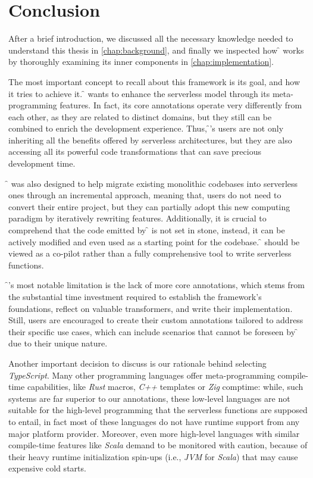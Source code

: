\chapter{Conclusion}
\label{chap:conclusion}

After a brief introduction, we discussed all the necessary knowledge needed
to understand this thesis in \cref{chap:background}, and finally we inspected
how \f{} works by thoroughly examining its inner components in \cref{chap:implementation}.

The most important concept to recall about this framework is its goal,
and how it tries to achieve it.
\f{} wants to enhance the serverless model through its meta-programming
features. In fact, its core annotations operate very differently from each other,
as they are related to distinct domains, but they still can be combined
to enrich the development experience.
Thus, \f{}'s users are not only inheriting all the
benefits offered by serverless architectures,
but they are also accessing all its powerful code
transformations that can save precious development time.

\f{} was also designed to help migrate existing
monolithic codebases into serverless ones through an incremental approach,
meaning that, users do not need to convert their entire project, but they
can partially adopt this new computing paradigm by iteratively rewriting features.
Additionally, it is crucial to comprehend that the code
emitted by \f{} is not set in stone, instead, it can be actively modified
and even used as a starting point for the codebase.
\f{} should be viewed as a co-pilot rather than a fully comprehensive tool to write serverless functions.

\f{}'s most notable limitation is the lack of more core annotations,
which stems from the substantial time investment required
to establish the framework's foundations, reflect on valuable transformers, and write their implementation.
Still, users are encouraged to create their custom annotations
tailored to address their specific use cases, which can include scenarios
that cannot be foreseen by \f{} due to their unique nature.

Another important decision to discuss is our rationale behind selecting \textit{TypeScript}.
Many other programming languages offer meta-programming compile-time capabilities,
like \textit{Rust} macros, \textit{C++} templates or \textit{Zig} comptime:
while, such systems are far superior to our annotations,
these low-level languages are not suitable for the high-level programming
that the serverless functions are supposed to entail, in fact most of these languages
do not have runtime support from any major platform provider.
Moreover, even more high-level languages with similar compile-time features like \textit{Scala}
demand to be monitored with caution, because of their heavy
runtime initialization spin-ups (i.e., \textit{JVM} for \textit{Scala})
that may cause expensive cold starts.

